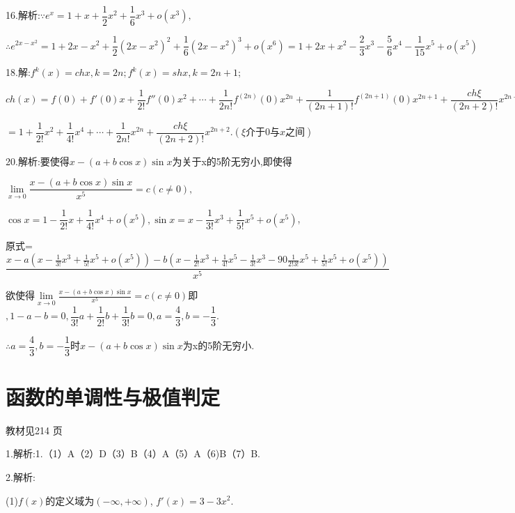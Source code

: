 16.解析:$\because {e^x} = 1 + x + \dfrac{1}{2}{x^2} + \dfrac{1}{6}{x^3} + o({x^3}),$

$\therefore {e^{2x - {x^2}}} = 1 + 2x - {x^2} + \dfrac{1}{2}{(2x - {x^2})^2} + \dfrac{1}{6}{(2x - {x^2})^3} + o({x^6}) = 1 + 2x + {x^2} - \dfrac{2}{3}{x^3} - \dfrac{5}{6}{x^4} - \dfrac{1}{{15}}{x^5} + o({x^5})$

18.解:${f^k}(x) = chx,k = 2n;{f^k}(x) = shx,k = 2n + 1;$

$ch(x) = f(0) + f'(0)x + \dfrac{1}{{2!}}f''(0){x^2} +  \cdots  + \dfrac{1}{{2n!}}{f^{(2n)}}(0){x^{2n}} + \dfrac{1}{{(2n + 1)!}}{f^{(2n + 1)}}(0){x^{2n + 1}} + \dfrac{{ch\xi }}{{(2n + 2)!}}{x^{2n + 2}}$

$ = 1 + \dfrac{1}{{2!}}{x^2} + \dfrac{1}{{4!}}{x^4} +  \cdots  + \dfrac{1}{{2n!}}{x^{2n}} + \dfrac{{ch\xi }}{{(2n + 2)!}}{x^{2n + 2}}$.$(\xi 介于0与x之间)$

20.解析:要使得$x - (a + b\cos x)\sin x$为关于x的5阶无穷小,即使得

$\lim\limits_{x \to 0}  \dfrac{{x - (a + b\cos x)\sin x}}{{{x^5}}} = c(c \ne 0),$

$\cos x = 1 - \dfrac{1}{{2!}}x + \dfrac{1}{{4!}}{x^4} + o({x^5}),\sin x = x - \dfrac{1}{{3!}}{x^3} + \dfrac{1}{{5!}}{x^5} + o({x^5})$,

原式=$\dfrac{{x - a(x - \frac{1}{{3!}}{x^3} + \frac{1}{{5!}}{x^5} + o({x^5})) - b(x - \frac{1}{{2!}}{x^3} + \frac{1}{{4!}}{x^5} - \frac{1}{{3!}}{x^3} - 90\frac{1}{{2!3!}}{x^5} + \frac{1}{{5!}}{x^5} + o({x^5}))}}{{{x^5}}}$

欲使得$\lim\limits_{x \to 0}  \frac{{x - (a + b\cos x)\sin x}}{{{x^5}}} = c(c \ne 0)$即$,1 - a - b = 0,\dfrac{1}{{3!}}a + \dfrac{1}{{2!}}b + \dfrac{1}{{3!}}b = 0,a = \dfrac{4}{3},b =  - \dfrac{1}{3}.$

$\therefore a = \dfrac{4}{3},b =  - \dfrac{1}{3}$时$x - (a + b\cos x)\sin x$为x的5阶无穷小.


\section{函数的单调性与极值判定}
\begin{flushright}
  \color{zhanqing!80}
   教材见214 页 %
\end{flushright}

1.解析:1.（1）A（2）D（3）B（4）A（5）A（6)B（7）B.

2.解析:

(1)$f\left( x \right)$的定义域为$\left( { - \infty , + \infty } \right)$, ${f' }\left( x \right) = 3 - 3{x^2}$.


